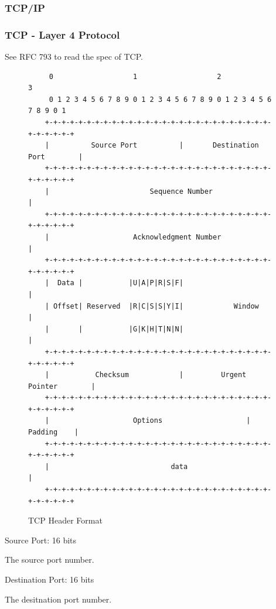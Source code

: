 \documentclass[11pt]{article}
\begin{document}
\subsubsection{TCP/IP}

\subsubsection{TCP - Layer 4 Protocol}

See RFC 793 to read the spec of TCP.

\begin{figure}[H]
    \centering
    \footnotesize
    \begin{varwidth}{\linewidth}
    \begin{verbatim}
     0                   1                   2                   3
     0 1 2 3 4 5 6 7 8 9 0 1 2 3 4 5 6 7 8 9 0 1 2 3 4 5 6 7 8 9 0 1
    +-+-+-+-+-+-+-+-+-+-+-+-+-+-+-+-+-+-+-+-+-+-+-+-+-+-+-+-+-+-+-+-+
    |          Source Port          |       Destination Port        |
    +-+-+-+-+-+-+-+-+-+-+-+-+-+-+-+-+-+-+-+-+-+-+-+-+-+-+-+-+-+-+-+-+
    |                        Sequence Number                        |
    +-+-+-+-+-+-+-+-+-+-+-+-+-+-+-+-+-+-+-+-+-+-+-+-+-+-+-+-+-+-+-+-+
    |                    Acknowledgment Number                      |
    +-+-+-+-+-+-+-+-+-+-+-+-+-+-+-+-+-+-+-+-+-+-+-+-+-+-+-+-+-+-+-+-+
    |  Data |           |U|A|P|R|S|F|                               |
    | Offset| Reserved  |R|C|S|S|Y|I|            Window             |
    |       |           |G|K|H|T|N|N|                               |
    +-+-+-+-+-+-+-+-+-+-+-+-+-+-+-+-+-+-+-+-+-+-+-+-+-+-+-+-+-+-+-+-+
    |           Checksum            |         Urgent Pointer        |
    +-+-+-+-+-+-+-+-+-+-+-+-+-+-+-+-+-+-+-+-+-+-+-+-+-+-+-+-+-+-+-+-+
    |                    Options                    |    Padding    |
    +-+-+-+-+-+-+-+-+-+-+-+-+-+-+-+-+-+-+-+-+-+-+-+-+-+-+-+-+-+-+-+-+
    |                             data                              |
    +-+-+-+-+-+-+-+-+-+-+-+-+-+-+-+-+-+-+-+-+-+-+-+-+-+-+-+-+-+-+-+-+
    \end{verbatim}
    \end{varwidth}
    \caption{TCP Header Format}\label{fig:tcp_header}
\end{figure}

Source Port: 16 bits

    The source port number.

Destination Port: 16 bits

    The desitnation port number.
\end{document}
